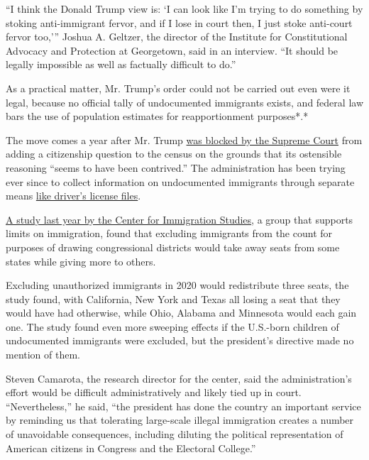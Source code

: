 ``I think the Donald Trump view is: `I can look like I'm trying to do
something by stoking anti-immigrant fervor, and if I lose in court then,
I just stoke anti-court fervor too,''' Joshua A. Geltzer, the director
of the Institute for Constitutional Advocacy and Protection at
Georgetown, said in an interview. ``It should be legally impossible as
well as factually difficult to do.''

As a practical matter, Mr. Trump's order could not be carried out even
were it legal, because no official tally of undocumented immigrants
exists, and federal law bars the use of population estimates for
reapportionment purposes*.*

The move comes a year after Mr. Trump
\href{https://www.nytimes.com/2019/07/02/us/trump-census-citizenship-question.html}{was
blocked by the Supreme Court} from adding a citizenship question to the
census on the grounds that its ostensible reasoning ``seems to have been
contrived.'' The administration has been trying ever since to collect
information on undocumented immigrants through separate means
\href{https://www.nytimes.com/aponline/2020/07/16/us/ap-us-census-citizenship.html}{like
driver's license files}.

\href{https://cis.org/Report/Impact-Legal-and-Illegal-Immigration-Apportionment-Seats-US-House-Representatives-2020}{A
study last year by the Center for Immigration Studies}, a group that
supports limits on immigration, found that excluding immigrants from the
count for purposes of drawing congressional districts would take away
seats from some states while giving more to others.

Excluding unauthorized immigrants in 2020 would redistribute three
seats, the study found, with California, New York and Texas all losing a
seat that they would have had otherwise, while Ohio, Alabama and
Minnesota would each gain one. The study found even more sweeping
effects if the U.S.-born children of undocumented immigrants were
excluded, but the president's directive made no mention of them.

Steven Camarota, the research director for the center, said the
administration's effort would be difficult administratively and likely
tied up in court. ``Nevertheless,'' he said, ``the president has done
the country an important service by reminding us that tolerating
large-scale illegal immigration creates a number of unavoidable
consequences, including diluting the political representation of
American citizens in Congress and the Electoral College.''

